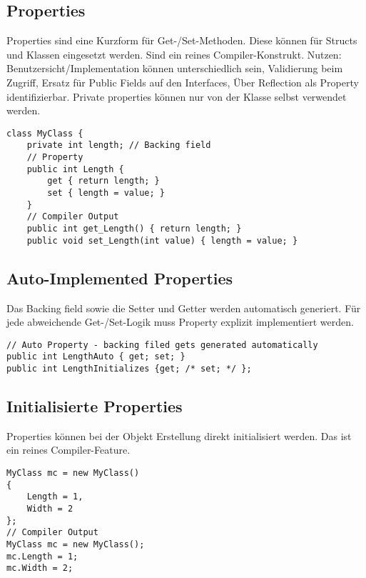 \subsection{Properties}
Properties sind eine Kurzform für Get-/Set-Methoden. Diese können für Structs und Klassen eingesetzt werden. Sind ein reines Compiler-Konstrukt. Nutzen: Benutzersicht/Implementation können unterschiedlich sein, Validierung beim Zugriff, Ersatz für Public Fields auf den Interfaces, Über Reflection als Property identifizierbar. Private properties können nur von der Klasse selbst verwendet werden.
\begin{lstlisting}
class MyClass {
	private int length; // Backing field
	// Property
	public int Length {
		get { return length; }
		set { length = value; }
	}
	// Compiler Output
	public int get_Length() { return length; } 
	public void set_Length(int value) { length = value; }
\end{lstlisting}

\subsection{Auto-Implemented Properties}
Das Backing field sowie die Setter und Getter werden automatisch generiert. Für jede abweichende Get-/Set-Logik muss Property explizit implementiert werden.
\begin{lstlisting}
// Auto Property - backing filed gets generated automatically
public int LengthAuto { get; set; }
public int LengthInitializes {get; /* set; */ };
\end{lstlisting}

\subsection{Initialisierte Properties}
Properties können bei der Objekt Erstellung direkt initialisiert werden. Das ist ein reines Compiler-Feature.
\begin{lstlisting}
MyClass mc = new MyClass()
{
	Length = 1, 
	Width = 2
};
// Compiler Output
MyClass mc = new MyClass();
mc.Length = 1;
mc.Width = 2;
\end{lstlisting}

